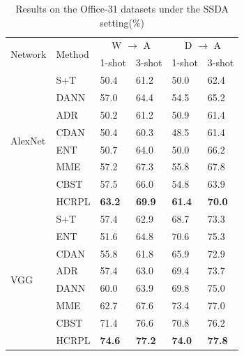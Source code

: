\documentclass[a4paper,fleqn]{cas-dc}
\begin{document}
	
	
	\begin{table}
		\small
		\centering
		\caption{Results on the Office-31 datasets under the SSDA setting(\%)}	
		\begin{tabular}{llllll}
			\toprule
			\multirow{2}{*}{Network}  & \multirow{2}{*}{Method} & \multicolumn{2}{c}{W $\rightarrow$ A} & \multicolumn{2}{c}{D $\rightarrow$ A} \\
			~ & ~ & 1-shot & 3-shot & 1-shot & 3-shot \\
			\midrule
			\multirow{8}{*}{AlexNet} & S+T & 50.4 & 61.2 & 50.0 & 62.4 \\
			~ & DANN \cite{ganin2016domain} & 57.0 & 64.4 & 54.5 & 65.2 \\
			~ & ADR \cite{saito2017adversarial} & 50.2 & 61.2 & 50.9 & 61.4 \\
			~ & CDAN \cite{long2018conditional} & 50.4 & 60.3 & 48.5 & 61.4 \\
			~ & ENT \cite{grandvalet2005semi} & 50.7 & 64.0 & 50.0 & 66.2 \\
			~ & MME \cite{saito2019semi} & 57.2 & 67.3 & 55.8 & 67.8 \\
			~ & CBST \cite{zou2018domain} & 57.5 & 66.0 & 54.8 & 63.9 \\
			~ & HCRPL & \textbf{63.2} & \textbf{69.9} & \textbf{61.4} & \textbf{70.0} \\
			\midrule
			\midrule
			\multirow{8}{*}{VGG} & S+T & 57.4 & 62.9 & 68.7 & 73.3 \\
			~ & ENT \cite{grandvalet2005semi}  & 51.6 & 64.8 & 70.6 & 75.3 \\
			~ & CDAN \cite{long2018conditional} & 55.8 & 61.8 & 65.9 & 72.9 \\
			~ & ADR \cite{saito2017adversarial} & 57.4 & 63.0 & 69.4 & 73.7 \\
			~ & DANN \cite{ganin2016domain} & 60.0 & 63.9 & 69.8 & 75.0 \\
			~ & MME \cite{saito2019semi} & 62.7 & 67.6 & 73.4 & 77.0 \\
			~ & CBST \cite{zou2018domain} & 71.4 & 76.6 & 70.8 & 76.2 \\
			~ & HCRPL & \textbf{74.6} & \textbf{77.2} & \textbf{74.0} & \textbf{77.8} \\
			\bottomrule
		\end{tabular}
		\label{table11}
	\end{table}
	
\end{document}
